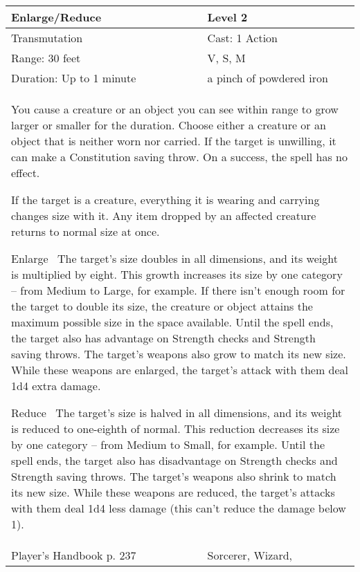 \documentclass[11pt]{report}
\begin{document}
\begin{table}[H]
	\begin{tabular}{||p{6cm}|p{6cm}||}
		\hline\hline
		\bf{Enlarge/Reduce} & Level 2\\ \hline
		Transmutation & Cast: 1 Action\\ \hline
		Range: 30 feet & V, S, M\\ \hline
		Duration: Up to 1 minute & a pinch of powdered iron\\ \hline
		\multicolumn{2}{||p{12cm}||}{You cause a creature or an object you can see within range to grow larger or smaller for the duration. Choose either a creature or an object that is neither worn nor carried. If the target is unwilling, it can make a Constitution saving throw. On a success, the spell has no effect. 

If the target is a creature, everything it is wearing and carrying changes size with it. Any item dropped by an affected creature returns to normal size at once. 

Enlarge 
The target’s size doubles in all dimensions, and its weight is multiplied by eight. This growth increases its size by one category – from Medium to Large, for example. If there isn’t enough room for the target to double its size, the creature or object attains the maximum possible size in the space available. Until the spell ends, the target also has advantage on Strength checks and Strength saving throws. The target’s weapons also grow to match its new size. While these weapons are enlarged, the target’s attack with them deal 1d4 extra damage. 

Reduce 
The target’s size is halved in all dimensions, and its weight is reduced to one-eighth of normal. This reduction decreases its size by one category – from Medium to Small, for example. Until the spell ends, the target also has disadvantage on Strength checks and Strength saving throws. The target’s weapons also shrink to match its new size. While these weapons are reduced, the target’s attacks with them deal 1d4 less damage (this can’t reduce the damage below 1).}\\ \hline
Player's Handbook p. 237 & Sorcerer, Wizard, \\ \hline\hline
	\end{tabular}
\end{table}
\end{document}
